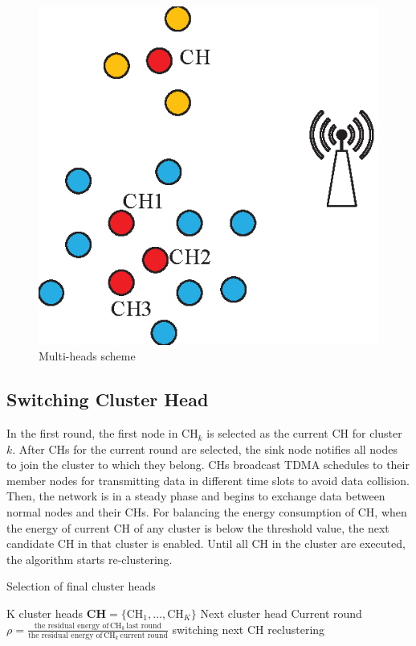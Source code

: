 \documentclass[journal,twoside,web]{ieeecolor}
\begin{document}
\begin{figure}[h!]
	\centering
	\includegraphics[width=0.7\linewidth]{multihead.eps}
	\caption{Multi-heads scheme}
	\label{fig7}
\end{figure}

\subsection{Switching Cluster Head}
In the first round, the first node in $\text{CH}_k$ is selected as the current CH for cluster $k$. After CHs for the current round are selected, the sink node notifies all nodes to join the cluster to which they belong. CHs broadcast TDMA schedules to their member nodes for transmitting data in different time slots to avoid data collision. Then, the network is in a steady phase and begins to exchange data between normal nodes and their CHs. For balancing the energy consumption of CH, when the energy of current CH of any cluster is below the threshold value, the next candidate CH in that cluster is enabled. Until all CH in the cluster are executed, the algorithm starts re-clustering.

\begin{algorithm}
	\caption{Selection of final cluster heads}
	\label{alg4} 
	\begin{algorithmic}[1]
		\renewcommand{\algorithmicrequire}{\textbf{Input:}}
		\renewcommand{\algorithmicensure}{\textbf{Output:}}
		\REQUIRE K cluster heads $\bm{CH} = \{\text{CH}_1,\dots,\text{CH}_K \}$
		\ENSURE Next cluster head
		\STATE 	Current round
			\STATE $\rho = \frac{\text{the residual energy of}\,  \text{CH}_k \,\text{last round}}{\text{the residual energy of}\,  \text{CH}_k \,\text{current round}}$
					\STATE switching next CH
				\ELSE
					\STATE reclustering
				\ENDIF
			\ENDIF
		\ENDFOR
	\end{algorithmic}
\end{algorithm}
\end{document}
